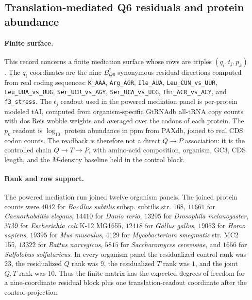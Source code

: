 \subsection{Translation-mediated Q6 residuals and protein abundance}
\label{sec:q6-translation-mediated-protein-abundance-cross-layer}

\paragraph{Finite surface.}
This record concerns a finite mediation surface whose rows are triples $(q_i,t_j,p_k)$.  The $q_i$ coordinates are the nine $B^{\ast}_{Q6}$ synonymous residual directions computed from real coding sequences: \texttt{K\_AAA}, \texttt{Arg\_AGR}, \texttt{Ile\_AUA}, \texttt{Leu\_CUN\_vs\_UUR}, \texttt{Leu\_UUA\_vs\_UUG}, \texttt{Ser\_UCR\_vs\_AGY}, \texttt{Ser\_UCA\_vs\_UCG}, \texttt{Thr\_ACR\_vs\_ACY}, and \texttt{f3\_stress}.  The $t_j$ readout used in the powered mediation panel is per-protein modeled tAI, computed from organism-specific GtRNAdb all-tRNA copy counts with dos Reis wobble weights and averaged over the codons of each protein.  The $p_k$ readout is $\log_{10}$ protein abundance in ppm from PAXdb, joined to real CDS codon counts.  The readback is therefore not a direct $Q \to P$ association: it is the controlled chain $Q \to T \to P$, with amino-acid composition, organism, GC3, CDS length, and the $M$-density baseline held in the control block.

\paragraph{Rank and row support.}
The powered mediation run joined twelve organism panels.  The joined protein counts were $4042$ for \textit{Bacillus subtilis} subsp. subtilis str. 168, $11661$ for \textit{Caenorhabditis elegans}, $14410$ for \textit{Danio rerio}, $13295$ for \textit{Drosophila melanogaster}, $3739$ for \textit{Escherichia coli} K-12 MG1655, $12418$ for \textit{Gallus gallus}, $19053$ for \textit{Homo sapiens}, $19395$ for \textit{Mus musculus}, $4129$ for \textit{Mycobacterium smegmatis} str. MC2 155, $13322$ for \textit{Rattus norvegicus}, $5815$ for \textit{Saccharomyces cerevisiae}, and $1656$ for \textit{Sulfolobus solfataricus}.  In every organism panel the residualized control rank was $23$, the residualized $Q$ rank was $9$, the residualized $T$ rank was $1$, and the joint $Q,T$ rank was $10$.  Thus the finite matrix has the expected degrees of freedom for a nine-coordinate residual block plus one translation-readout coordinate after the control projection.

